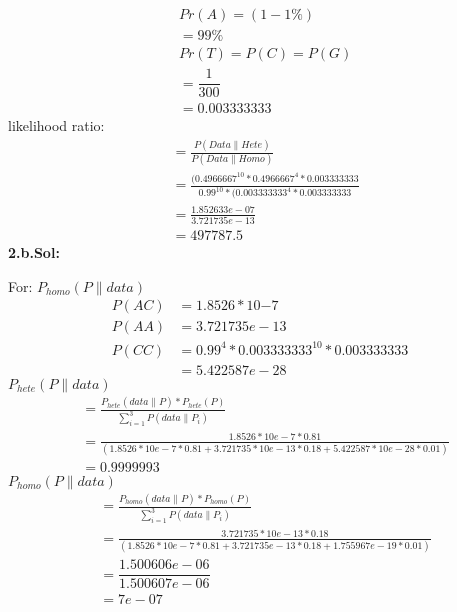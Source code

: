 \documentclass[a4paper,11pt]{article}\usepackage{graphicx, color}
\begin{document}
 \begin{align}
 &Pr(A) = (1- 1\%) \\
          &= 99\%  \\
 	&Pr(T)=P(C)=P(G) \\
        & = \dfrac{1}{300} \\ 
        &= 0.003333333
\end{align}
likelihood ratio: 
\begin{align}
	 	& = \frac{P(Data\|Hete)}{P(Data\|Homo)}  \\
 		& = \frac{(0.4966667^{10} * 0.4966667^{4} * 0.003333333}{0.99^{10} * ({0.003333333}^{4} * 0.003333333} \\
    & = \frac{1.852633e-07}{3.721735e-13} \\
 		& = 497787.5
 \end{align}
\textbf{2.b.Sol:}

For: $P_{homo}(P\|data)$
\begin{align}
		P(AC) &=  1.8526 * 10{-7}  \\
		P(AA) &=  3.721735e-13 \\
		P(CC) &= 0.99^{4} * 0.003333333^{10} * 0.003333333  \\
		& =  5.422587e-28
\end{align}
$P_{hete}(P\|data)$
\begin{align}
		&=\frac{P_{hete}(data\|P) * P_{hete}(P)}{\sum_{i=1}^{3}P(data\|P_{i})} \\
		&= \frac{1.8526 * 10e-7 * 0.81}{(1.8526 * 10e-7 * 0.81 + 3.721735 * 10e-13 * 0.18 + 5.422587*10e-28 * 0.01)} \\
		&=0.9999993
\end{align}
$P_{homo}(P\|data)$
\begin{align}
		&=\frac{P_{homo}(data\|P) * P_{homo}(P)}{\sum_{i=1}^{3}P(data\|P_{i})} \\
		&= \frac{3.721735 * 10e-13 * 0.18 }{(1.8526 * 10e-7 * 0.81 + 3.721735e-13 * 0.18 + 1.755967e-19 * 0.01)} \\
		&= \dfrac{1.500606e-06}{1.500607e-06} \\
		&=7e-07
\end{align}
\end{document}
